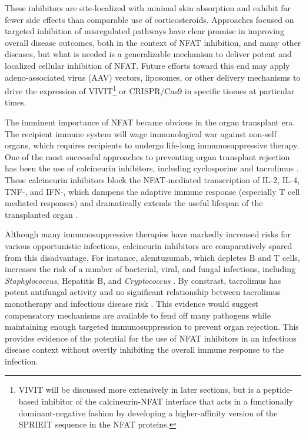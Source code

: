 These inhibitors are site-localized with minimal skin absorption and exhibit far fewer side effects than comparable use of corticosteroids. Approaches focused on targeted inhibition of misregulated pathways have clear promise in improving overall disease outcomes, both in the context of NFAT inhibition, and many other diseases, but what is needed is a generalizable mechanism to deliver potent and localized cellular inhibition of NFAT. Future efforts toward this end may apply adeno-associated virus (AAV) vectors, liposomes, or other delivery mechanisms to drive the expression of VIVIT\footnote{VIVIT will be discussed more extensively in later sections, but is a peptide-based inhibitor of the calcineurin-NFAT interface that acts in a functionally dominant-negative fashion by developing a higher-affinity version of the SPRIEIT sequence in the NFAT proteins.} or CRISPR/Cas9 in specific tissues at particular times.

The imminent importance of NFAT became obvious in the organ transplant era. The recipient immune system will wage immunological war against non-self organs, which requires recipients to undergo life-long immunosuppressive therapy. One of the most successful approaches to preventing organ transplant rejection has been the use of calcineurin inhibitors, including cyclosporine and tacrolimus \citep{Ellis1995, Scott2003, Mihatsch1998}. These calcineurin inhibitors block the NFAT-mediated transcription of IL-2, IL-4, TNF-\textalpha, and IFN-\textgamma, which dampens the adaptive immune response (especially T cell mediated responses) and dramatically extends the useful lifespan of the transplanted organ \citep{McCaffrey1993}. 

Although many immunosuppressive therapies have markedly increased risks for various opportunistic infections, calcineurin inhibitors are comparatively spared from this disadvantage. For instance, alemtuzumab, which depletes B and T cells, increases the risk of a number of bacterial, viral, and fungal infections, including \textit{Staphylococcus}, Hepatitis B, and \textit{Cryptococcus} \citep{Harris2021, Fishman2007}. By constrast, tacrolimus has potent antifungal activity and no significant relationship between tacrolimus monotherapy and infectious disease risk \citep{Singh2016, Gong2021, Papon2021, McAlister2006}. This evidence would suggest compensatory mechanisms are available to fend off many pathogens while maintaining enough targeted immunosuppression to prevent organ rejection. This provides evidence of the potential for the use of NFAT inhibitors in an infectious disease context without overtly inhibiting the overall immune response to the infection. 

